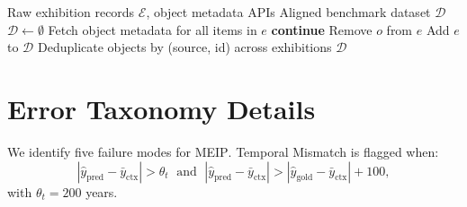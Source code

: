 \documentclass[11pt]{article}
\newcommand{\meip}{\textsc{MEIP}}
\begin{document}
\begin{algorithm}[t]
\small
\caption{ExhibitionBench data collection and filtering}
\label{alg:collect}
\begin{algorithmic}[1]
\Require Raw exhibition records $\mathcal{E}$, object metadata APIs
\Ensure Aligned benchmark dataset $\mathcal{D}$
\State $\mathcal{D} \gets \emptyset$
        \State Fetch object metadata for all items in $e$
         \State \textbf{continue} \EndIf
             \State Remove $o$ from $e$ \EndIf
        \EndFor
         \State Add $e$ to $\mathcal{D}$ \EndIf
    \EndFor
\EndFor
\State Deduplicate objects by (source, id) across exhibitions
\State \Return $\mathcal{D}$
\end{algorithmic}
\end{algorithm}

\section{Error Taxonomy Details}
\label{app:errors}

We identify five failure modes for \meip{}.
Temporal Mismatch is flagged when:
\begin{equation}
|\hat{y}_\text{pred} - \bar{y}_\text{ctx}| > \theta_t
\;\text{ and }\;
|\hat{y}_\text{pred} - \bar{y}_\text{ctx}| > |\hat{y}_\text{gold} - \bar{y}_\text{ctx}| + 100,
\label{eq:temporal}
\end{equation}
with $\theta_t = 200$ years.

\begin{table}[!t]
\centering\small
{}
\caption{Error type distribution (normalised per model). Sem.O.\ = Semantic Overlap; Pop.B.\ = Popularity Bias.}
\label{tab:errors}
\end{table}
\end{document}
